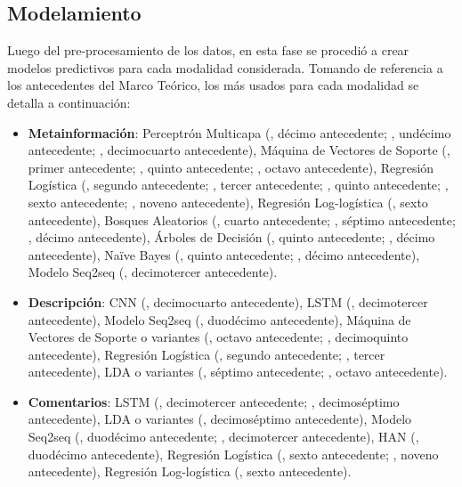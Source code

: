 \subsection{Modelamiento}
Luego del pre-procesamiento de los datos, en esta fase se procedió a crear modelos predictivos para cada modalidad considerada. Tomando de referencia a los antecedentes del Marco Teórico, los más usados para cada modalidad se detalla a continuación:
\begin{itemize}
	\item \textbf{Metainformación}: Perceptrón Multicapa (\cite{pr_kamath2018suplearn}, décimo antecedente; \cite{pr_yu2018deeplearning}, undécimo antecedente; \cite{pr_cheng2019deeplearning}, decimocuarto antecedente), Máquina de Vectores de Soporte (\cite{pr_chen2013kickpredict}, primer antecedente; \cite{pr_beckwith2016predcrowd}, quinto antecedente; \cite{pr_sawhney2016usingLT}, octavo antecedente), Regresión Logística (\cite{pr_mitra2014phrases}, segundo antecedente; \cite{pr_zhou2015projectdesc}, tercer antecedente; \cite{pr_beckwith2016predcrowd}, quinto antecedente; \cite{pr_li2016predcrowd}, sexto antecedente; \cite{pr_kaur2017socmedcrowd}, noveno antecedente), Regresión Log-logística (\cite{pr_li2016predcrowd}, sexto antecedente), Bosques Aleatorios (\cite{pr_chen2015predcrowd}, cuarto antecedente; \cite{pr_yuan2016textanalytics}, séptimo antecedente; \cite{pr_kamath2018suplearn}, décimo antecedente), Árboles de Decisión (\cite{pr_beckwith2016predcrowd}, quinto antecedente; \cite{pr_kamath2018suplearn}, décimo antecedente), Naïve Bayes (\cite{pr_beckwith2016predcrowd}, quinto antecedente; \cite{pr_kamath2018suplearn}, décimo antecedente), Modelo Seq2seq (\cite{pr_jin2019dayssuccess}, decimotercer antecedente).
	\item \textbf{Descripción}: CNN (\cite{pr_cheng2019deeplearning}, decimocuarto antecedente), LSTM (\cite{pr_jin2019dayssuccess}, decimotercer antecedente), Modelo Seq2seq (\cite{pr_lee2018contentDL}, duodécimo antecedente), Máquina de Vectores de Soporte o variantes (\cite{pr_sawhney2016usingLT}, octavo antecedente; \cite{pr_chen2019keywords_crowdfunding}, decimoquinto antecedente), Regresión Logística (\cite{pr_mitra2014phrases}, segundo antecedente; \cite{pr_zhou2015projectdesc}, tercer antecedente), LDA o variantes (\cite{pr_yuan2016textanalytics}, séptimo antecedente; \cite{pr_sawhney2016usingLT}, octavo antecedente).
	\item \textbf{Comentarios}: LSTM (\cite{pr_jin2019dayssuccess}, decimotercer antecedente; \cite{pr_shafqat2019topicpredictions}, decimoséptimo antecedente), LDA o variantes (\cite{pr_shafqat2019topicpredictions}, decimoséptimo antecedente), Modelo Seq2seq (\cite{pr_lee2018contentDL}, duodécimo antecedente; \cite{pr_jin2019dayssuccess}, decimotercer antecedente), HAN (\citeauthor{pr_lee2018contentDL}, duodécimo antecedente), Regresión Logística (\cite{pr_li2016predcrowd}, sexto antecedente; \cite{pr_kaur2017socmedcrowd}, noveno antecedente), Regresión Log-logística (\cite{pr_li2016predcrowd}, sexto antecedente).
\end{itemize}

